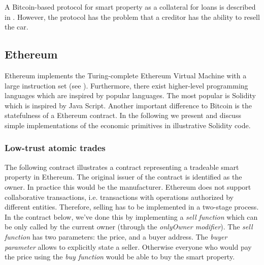 A Bitcoin-based protocol for smart property as a collateral for loans is described in \cite{smartproperty2011}. However, the protocol has the problem that a creditor has the ability to resell the car. 

\subsection{Ethereum}

Ethereum implements the Turing-complete Ethereum Virtual Machine with a large instruction set (see \cite{wood2014ethereum}). Furthermore, there exist higher-level programming languages which are inspired by popular languages. The most popular is Solidity which is inspired by Java Script. Another important difference to Bitcoin is the statefulness of a Ethereum contract. In the following we present and discuss simple implementations of the economic primitives in illustrative Solidity code.

\subsubsection{Low-trust atomic trades}

The following contract illustrates a contract representing a tradeable smart property in Ethereum. The original issuer of the contract is identified as the owner. In practice this would be the manufacturer. Ethereum does not support collaborative transactions, i.e. transactions with operations authorized by different entities. Therefore, selling has to be implemented in a two-stage process. In the contract below, we've done this by implementing a \emph{sell function} which can be only called by the current owner (through the \emph{onlyOwner modifier}). The \emph{sell function} has two parameters: the price, and a buyer address. The \emph{buyer parameter} allows to explicitly state a seller. Otherwise everyone who would pay the price using the \emph{buy function} would be able to buy the smart property.


